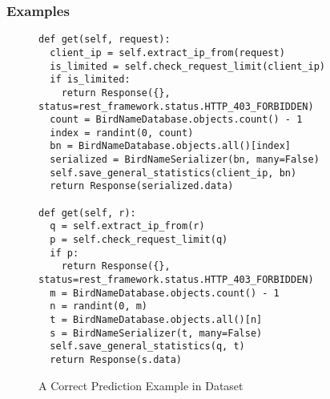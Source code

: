 \subsubsection{Examples}
\label{sec:eval-example}

\begin{figure}[t]
	\centering
	\begin{lstlisting}[]
def get(self, request):
  client_ip = self.extract_ip_from(request)
  is_limited = self.check_request_limit(client_ip)
  if is_limited:
    return Response({}, status=rest_framework.status.HTTP_403_FORBIDDEN)
  count = BirdNameDatabase.objects.count() - 1
  index = randint(0, count)
  bn = BirdNameDatabase.objects.all()[index]
  serialized = BirdNameSerializer(bn, many=False)
  self.save_general_statistics(client_ip, bn)
  return Response(serialized.data)

def get(self, r):
  q = self.extract_ip_from(r)
  p = self.check_request_limit(q)
  if p:
    return Response({}, status=rest_framework.status.HTTP_403_FORBIDDEN)
  m = BirdNameDatabase.objects.count() - 1
  n = randint(0, m)
  t = BirdNameDatabase.objects.all()[n]
  s = BirdNameSerializer(t, many=False)
  self.save_general_statistics(q, t)
  return Response(s.data)       
\end{lstlisting}
\vspace{-16pt}
\caption{A Correct Prediction Example in Dataset}
\label{example1}
\end{figure}
